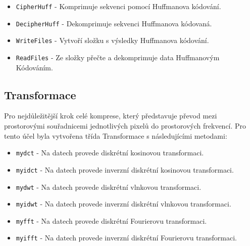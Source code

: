 \begin{itemize}
    \item \texttt{CipherHuff} - Komprimuje sekvenci pomocí Huffmanova kódování.
    \item \texttt{DecipherHuff}  - Dekomprimuje sekvenci Huffmanova kódovaná.
    \item \texttt{WriteFiles} - Vytvoří složku s výsledky Huffmanova kódování.
    \item \texttt{ReadFiles} - Ze složky přečte a dekomprimuje data Huffmanovým Kódováním.
\end{itemize}

\subsection{Transformace}

Pro nejdůležitější krok celé komprese, který představuje převod mezi prostorovými souřadnicemi jednotlivých pixelů do prostorových frekvencí. Pro tento účel byla vytvořena třída Transformace s následujícími metodami:

\begin{itemize}
    \item \texttt{mydct} - Na datech provede diskrétní kosinovou transformaci.
    \item \texttt{myidct}  - Na datech provede inverzní diskrétní kosinovou transformaci. 
    \item \texttt{mydwt} - Na datech provede diskrétní vlnkovou transformaci.
    \item \texttt{myidwt} - Na datech provede inverzní diskrétní vlnkovou transformaci.
    \item \texttt{myfft} - Na datech provede diskrétní Fourierovu transformaci.
    \item \texttt{myifft} - Na datech provede inverzní diskrétní Fourierovu transformaci.
\end{itemize}